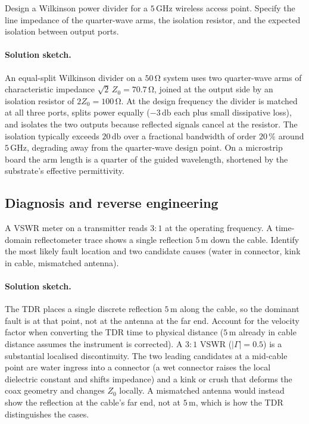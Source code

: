 \begin{exercise}
Design a Wilkinson power divider for a $5\,\si{\giga\hertz}$ wireless
access point. Specify the line impedance of the quarter-wave arms,
the isolation resistor, and the expected isolation between output
ports.
\paragraph{Solution sketch.} An equal-split Wilkinson divider on a
$50\,\si{\ohm}$ system uses two quarter-wave arms of characteristic
impedance $\sqrt{2}\,Z_{0} = 70.7\,\si{\ohm}$, joined at the output
side by an isolation resistor of $2 Z_{0} = 100\,\si{\ohm}$. At the
design frequency the divider is matched at all three ports, splits
power equally ($-3\,\si{\decibel}$ each plus small dissipative loss),
and isolates the two outputs because reflected signals cancel at the
resistor. The isolation typically exceeds $20\,\si{\decibel}$ over a
fractional bandwidth of order $20\,\%$ around $5\,\si{\giga\hertz}$,
degrading away from the quarter-wave design point. On a microstrip
board the arm length is a quarter of the guided wavelength, shortened
by the substrate's effective permittivity.
\end{exercise}

\subsection*{Diagnosis and reverse engineering}

\begin{exercise}
A VSWR meter on a transmitter reads $3:1$ at the operating frequency.
A time-domain reflectometer trace shows a single reflection $5\,\si{
\meter}$ down the cable. Identify the most likely fault location and
two candidate causes (water in connector, kink in cable, mismatched
antenna).
\paragraph{Solution sketch.} The TDR places a single discrete
reflection $5\,\si{\meter}$ along the cable, so the dominant fault is at
that point, not at the antenna at the far end. Account for the velocity
factor when converting the TDR time to physical distance ($5\,\si{
\meter}$ already in cable distance assumes the instrument is corrected).
A $3{:}1$ VSWR ($|\Gamma| = 0.5$) is a substantial localised
discontinuity. The two leading candidates at a mid-cable point are
water ingress into a connector (a wet connector raises the local
dielectric constant and shifts impedance) and a kink or crush that
deforms the coax geometry and changes $Z_{0}$ locally. A mismatched
antenna would instead show the reflection at the cable's far end, not at
$5\,\si{\meter}$, which is how the TDR distinguishes the cases.
\end{exercise}

